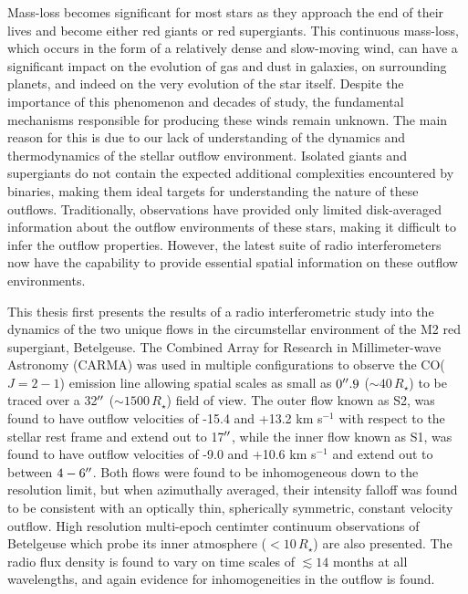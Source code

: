 
\begin{abstracts} 
\vspace{-0.5cm}
Mass-loss becomes significant for most stars as they approach the end of their lives and become either red giants or red supergiants. This continuous mass-loss, which occurs in the form of a relatively dense and slow-moving wind, can have a significant impact on the evolution of gas and dust in galaxies, on surrounding planets, and indeed on the very evolution of the star itself.  Despite the importance of this phenomenon and decades of study,
the fundamental mechanisms responsible for producing these winds remain unknown. The main reason for this is due to our lack of understanding of the dynamics and thermodynamics of the stellar outflow environment. Isolated giants and supergiants do not contain the expected additional complexities encountered by binaries, making them ideal targets for understanding the nature of these outflows. Traditionally, observations have provided only limited disk-averaged information about the outflow environments of these stars, making it difficult to infer the outflow properties. However, the latest suite of radio interferometers now have the capability to provide essential spatial information on these outflow environments.

This thesis first presents the results of a radio interferometric study into the dynamics of the two unique flows in the circumstellar environment of the  M2 red supergiant, Betelgeuse. The  Combined Array for Research in Millimeter-wave Astronomy (CARMA) was used in multiple configurations to observe the CO($J=2-1$) emission line allowing  spatial scales as small as $0^{\prime\prime} .9$ ($\sim 40\,R_{\star}$) to be traced over a 32$^{\prime\prime}$ ($\sim 1500\,R_{\star}$) field of view. The outer flow known as S2, was found to have outflow velocities of -15.4 and +13.2 km s$^{-1}$ with respect to the stellar rest frame and extend out to 17$^{\prime\prime}$, while the inner flow known as S1, was found to have outflow velocities of -9.0 and +10.6 km s$^{-1}$ and extend out to between $4 - 6^{\prime\prime}$. Both flows were found to be inhomogeneous down to the resolution limit, but when azimuthally averaged, their intensity falloff was found to be consistent with an optically thin, spherically symmetric, constant velocity outflow. High resolution multi-epoch centimter continuum observations of Betelgeuse which probe its inner atmosphere ($< 10\,R_{\star}$) are also presented. The radio flux density is found to vary on time scales of $\lesssim 14$ months at all wavelengths, and again evidence for inhomogeneities in the outflow is found.


\end{abstracts}
